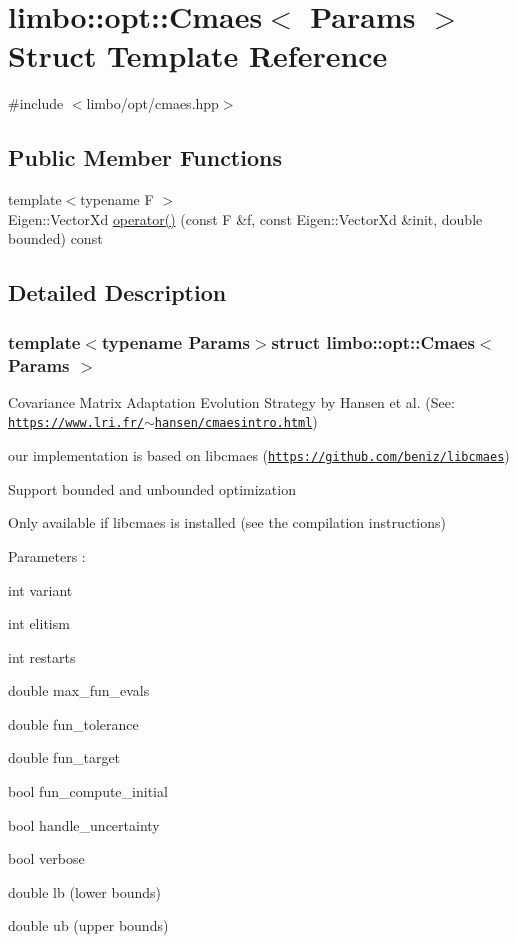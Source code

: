 \hypertarget{structlimbo_1_1opt_1_1_cmaes}{}\section{limbo\+:\+:opt\+:\+:Cmaes$<$ Params $>$ Struct Template Reference}
\label{structlimbo_1_1opt_1_1_cmaes}


{\ttfamily \#include $<$limbo/opt/cmaes.\+hpp$>$}

\subsection*{Public Member Functions}
\begin{DoxyCompactItemize}
\item 
{\footnotesize template$<$typename F $>$ }\\Eigen\+::\+Vector\+Xd \hyperlink{structlimbo_1_1opt_1_1_cmaes_a47ee6970bd2300108c83281ea6fced17}{operator()} (const F \&f, const Eigen\+::\+Vector\+Xd \&init, double bounded) const 
\end{DoxyCompactItemize}


\subsection{Detailed Description}
\subsubsection*{template$<$typename Params$>$struct limbo\+::opt\+::\+Cmaes$<$ Params $>$}

Covariance Matrix Adaptation Evolution Strategy by Hansen et al. (See\+: \href{https://www.lri.fr/~hansen/cmaesintro.html}{\tt https\+://www.\+lri.\+fr/$\sim$hansen/cmaesintro.\+html})
\begin{DoxyItemize}
\item our implementation is based on libcmaes (\href{https://github.com/beniz/libcmaes}{\tt https\+://github.\+com/beniz/libcmaes})
\item Support bounded and unbounded optimization
\item Only available if libcmaes is installed (see the compilation instructions)
\item Parameters \+:
\begin{DoxyItemize}
\item int variant
\item int elitism
\item int restarts
\item double max\+\_\+fun\+\_\+evals
\item double fun\+\_\+tolerance
\item double fun\+\_\+target
\item bool fun\+\_\+compute\+\_\+initial
\item bool handle\+\_\+uncertainty
\item bool verbose
\item double lb (lower bounds)
\item double ub (upper bounds) 
\end{DoxyItemize}
\end{DoxyItemize}

